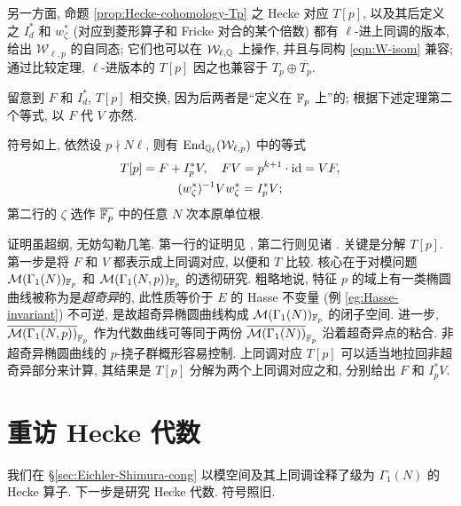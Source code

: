 另一方面, 命题 \ref{prop:Hecke-cohomology-Tp} 之 Hecke 对应 $T[p]$, 以及其后定义之 $I_d^*$ 和 $w_\zeta^*$ (对应到菱形算子和 Fricke 对合的某个倍数) 都有 $\ell$-进上同调的版本, 给出 $\mathcal{W}_{\ell, p}$ 的自同态; 它们也可以在 $\mathcal{W}_{\ell, \mathbb{Q}}$ 上操作, 并且与同构 \eqref{eqn:W-isom} 兼容; 通过比较定理, $\ell$-进版本的 $T[p]$ 因之也兼容于 $T_p \oplus \overline{T_p}$.

留意到 $F$ 和 $I_d^*$, $T[p]$ 相交换, 因为后两者是``定义在 $\mathbb{F}_p$ 上''的; 根据下述定理第二个等式, 以 $F$ 代 $V$ 亦然.

\begin{theorem}\label{prop:Eichler-Shimura-cong}
	符号如上, 依然设 $p \nmid N\ell$, 则有 $\operatorname{End}_{\mathbb{Q}_\ell}(\mathcal{W}_{\ell, p})$ 中的等式
	\begin{equation*}\begin{gathered}
			T[p] = F + I_p^* V, \quad FV = p^{k+1} \cdot \mathrm{id} = VF, \\
			(w_\zeta^*)^{-1} V w_\zeta^* =  I_p^* V ;
	\end{gathered}\end{equation*}
	第二行的 $\zeta$ 选作 $\overline{\mathbb{F}_p}$ 中的任意 $N$ 次本原单位根.
\end{theorem}

证明虽超纲, 无妨勾勒几笔. 第一行的证明见 \cite[Proposition 4.8]{Del71}, 第二行则见诸 \cite[Corollary 7.10 或 (7.5.2)]{Shi71}. 关键是分解 $T[p]$. 第一步是将 $F$ 和 $V$ 都表示成上同调对应, 以便和 $T$ 比较. 核心在于对模问题 $\mathcal{M}(\Gamma_1(N))_{\mathbb{F}_p}$ 和 $\mathcal{M}(\Gamma_1(N, p))_{\mathbb{F}_p}$ 的透彻研究. 粗略地说, 特征 $p$ 的域上有一类椭圆曲线被称为是\emph{超奇异}的, 此性质等价于 $E$ 的 Hasse 不变量 (例 \ref{eg:Hasse-invariant}) 不可逆, 是故超奇异椭圆曲线构成 $\mathcal{M}(\Gamma_1(N))_{\mathbb{F}_p}$ 的闭子空间. 进一步, $\overline{\mathcal{M}(\Gamma_1(N, p))}_{\mathbb{F}_p}$ 作为代数曲线可等同于两份 $\overline{\mathcal{M}(\Gamma_1(N))}_{\mathbb{F}_p}$ 沿着超奇异点的粘合. 非超奇异椭圆曲线的 $p$-挠子群概形容易控制. 上同调对应 $T[p]$ 可以适当地拉回非超奇异部分来计算, 其结果是 $T[p]$ 分解为两个上同调对应之和, 分别给出 $F$ 和 $I_p^* V$. 

\section{重访 Hecke 代数}\label{sec:Hecke-revisited}
我们在 \S\ref{sec:Eichler-Shimura-cong} 以模空间及其上同调诠释了级为 $\Gamma_1(N)$ 的 Hecke 算子. 下一步是研究 Hecke 代数. 符号照旧.

